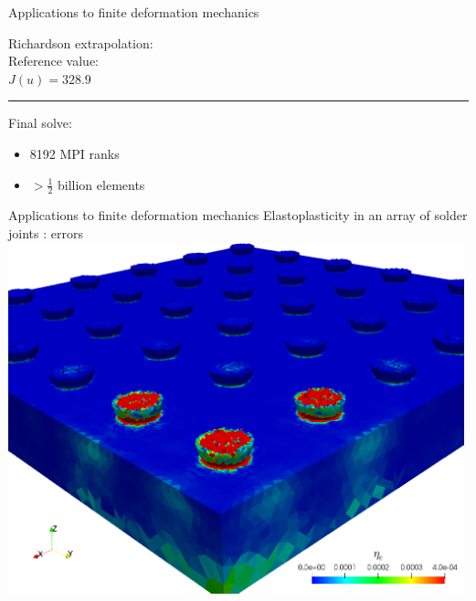 \documentclass[fleqn]{beamer}
\begin{document}
\begin{frame}{Applications to finite deformation mechanics}
\begin{minipage}{0.4\textwidth}
Richardson extrapolation: \\
Reference value: \\
$J(u) = 328.9$ \\
\vspace{0.5em}
\hrule
\vspace{1em}
Final solve:
\begin{itemize}
\item 8192 MPI ranks
\item $> \frac12$ billion elements
\end{itemize}
\end{minipage}
\end{frame}


\begin{frame}{Applications to finite deformation mechanics}
{Elastoplasticity in an array of solder joints : errors}
\centering
\includegraphics[width=0.99\textwidth]{../img/aut_solder_error}
\end{frame}

\end{document}
